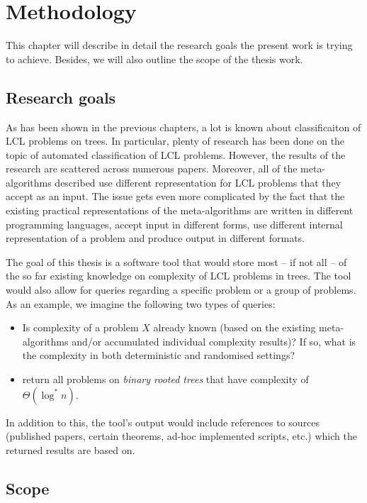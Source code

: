 \chapter{Methodology}
\label{chapter:methods}

This chapter will describe in detail the research goals the present work
is trying to achieve. Besides, we will also outline the scope of the thesis work.

\section{Research goals}

As has been shown in the previous chapters, a lot is known about classificaiton
of LCL problems on trees. In particular, plenty of research has been done
on the topic of automated classification of LCL problems. However, the
results of the research are scattered across numerous papers. Moreover,
all of the meta-algorithms described use different representation for LCL
problems that they accept as an input.
The issue gets even more complicated by the fact that the existing practical representations
of the meta-algorithms are written in different programming languages, accept input in
different forms,
use different internal representation of a problem and produce output in different
formats.

The goal of this thesis is a software tool that would store most -- if not all -- of
the so far existing knowledge on complexity of LCL problems in trees.
The tool would also allow for queries regarding a specific problem or a group of
problems. As an example, we imagine the following two types of queries:
\begin{itemize}
  \item Is complexity of a problem $X$ already known (based on the existing meta-algorithms
  and/or accumulated individual complexity results)? If so, what is the complexity in both
  deterministic and randomised settings?
  \item return all problems on \emph{binary rooted trees} that have complexity of
  $\Theta(\log^* n)$.
\end{itemize}
In addition to this, the tool’s output would include references to sources
(published papers, certain theorems, ad-hoc implemented scripts, etc.)
which the returned results are based on.

\section{Scope}

